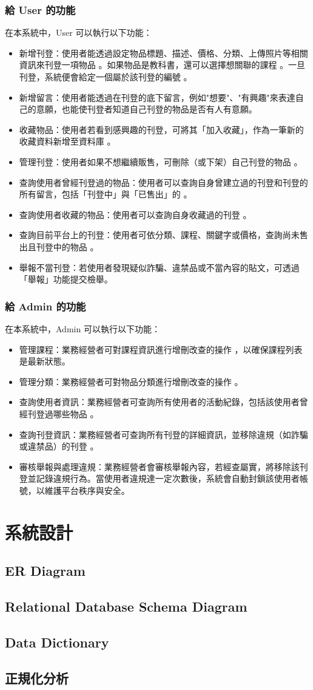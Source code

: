 \documentclass[a4paper]{article}
\begin{document}
\subsubsection{給 User 的功能}
在本系統中，User 可以執行以下功能：
\begin{itemize}
    \item 新增刊登：使用者能透過設定物品標題、描述、價格、分類、上傳照片等相關資訊來刊登一項物品 。如果物品是教科書，還可以選擇想關聯的課程 。一旦刊登，系統便會給定一個屬於該刊登的編號 。
    \item 新增留言：使用者能透過在刊登的底下留言，例如"想要"、"有興趣"來表達自己的意願，也能使刊登者知道自己刊登的物品是否有人有意願。
    \item 收藏物品：使用者若看到感興趣的刊登，可將其「加入收藏」，作為一筆新的收藏資料新增至資料庫 。
    \item 管理刊登：使用者如果不想繼續販售，可刪除（或下架）自己刊登的物品 。
    \item 查詢使用者曾經刊登過的物品：使用者可以查詢自身曾建立過的刊登和刊登的所有留言，包括「刊登中」與「已售出」的 。
    \item 查詢使用者收藏的物品：使用者可以查詢自身收藏過的刊登 。
    \item 查詢目前平台上的刊登：使用者可依分類、課程、關鍵字或價格，查詢尚未售出且刊登中的物品 。
    \item 舉報不當刊登：若使用者發現疑似詐騙、違禁品或不當內容的貼文，可透過「舉報」功能提交檢舉。
\end{itemize}

\subsubsection{給 Admin 的功能}
在本系統中，Admin 可以執行以下功能：
\begin{itemize}
    \item 管理課程：業務經營者可對課程資訊進行增刪改查的操作 ，以確保課程列表是最新狀態。
    \item 管理分類：業務經營者可對物品分類進行增刪改查的操作 。
    \item 查詢使用者資訊：業務經營者可查詢所有使用者的活動紀錄，包括該使用者曾經刊登過哪些物品 。
    \item 查詢刊登資訊：業務經營者可查詢所有刊登的詳細資訊，並移除違規（如詐騙或違禁品）的刊登 。
    \item 審核舉報與處理違規：業務經營者會審核舉報內容，若經查屬實，將移除該刊登並記錄違規行為。當使用者違規達一定次數後，系統會自動封鎖該使用者帳號，以維護平台秩序與安全。
\end{itemize}

\section{系統設計}
\subsection{ER Diagram}
\subsection{Relational Database Schema Diagram}
\subsection{Data Dictionary}
\subsection{正規化分析}
\end{document}
